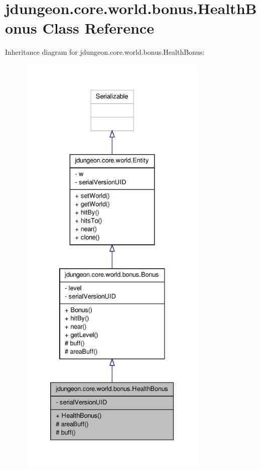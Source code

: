 \hypertarget{classjdungeon_1_1core_1_1world_1_1bonus_1_1_health_bonus}{
\section{jdungeon.core.world.bonus.HealthBonus Class Reference}
\label{classjdungeon_1_1core_1_1world_1_1bonus_1_1_health_bonus}
}


Inheritance diagram for jdungeon.core.world.bonus.HealthBonus:
\nopagebreak
\begin{figure}[H]
\begin{center}
\leavevmode
\includegraphics[height=600pt]{classjdungeon_1_1core_1_1world_1_1bonus_1_1_health_bonus__inherit__graph}
\end{center}
\end{figure}


